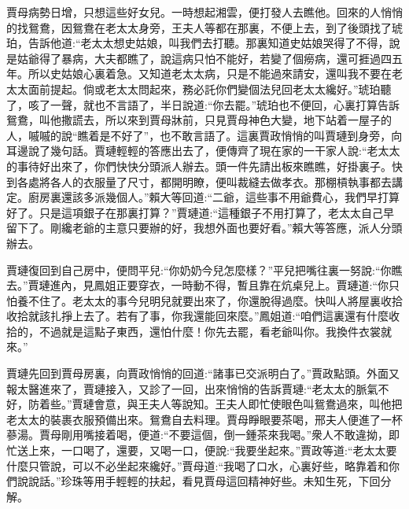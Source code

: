 \begin{parag}
    賈母病勢日增，只想這些好女兒。一時想起湘雲，便打發人去瞧他。回來的人悄悄的找鴛鴦，因鴛鴦在老太太身旁，王夫人等都在那裏，不便上去，到了後頭找了琥珀，告訴他道:“老太太想史姑娘，叫我們去打聽。那裏知道史姑娘哭得了不得，說是姑爺得了暴病，大夫都瞧了，說這病只怕不能好，若變了個癆病，還可捱過四五年。所以史姑娘心裏着急。又知道老太太病，只是不能過來請安，還叫我不要在老太太面前提起。倘或老太太問起來，務必託你們變個法兒回老太太纔好。”琥珀聽了，咳了一聲，就也不言語了，半日說道:“你去罷。”琥珀也不便回，心裏打算告訴鴛鴦，叫他撒謊去，所以來到賈母牀前，只見賈母神色大變，地下站着一屋子的人，嘁嘁的說“瞧着是不好了”，也不敢言語了。這裏賈政悄悄的叫賈璉到身旁，向耳邊說了幾句話。賈璉輕輕的答應出去了，便傳齊了現在家的一干家人說:“老太太的事待好出來了，你們快快分頭派人辦去。頭一件先請出板來瞧瞧，好掛裏子。快到各處將各人的衣服量了尺寸，都開明瞭，便叫裁縫去做孝衣。那棚槓執事都去講定。廚房裏還該多派幾個人。”賴大等回道:“二爺，這些事不用爺費心，我們早打算好了。只是這項銀子在那裏打算？”賈璉道:“這種銀子不用打算了，老太太自己早留下了。剛纔老爺的主意只要辦的好，我想外面也要好看。”賴大等答應，派人分頭辦去。
\end{parag}


\begin{parag}
    賈璉復回到自己房中，便問平兒:“你奶奶今兒怎麼樣？”平兒把嘴往裏一努說:“你瞧去。”賈璉進內，見鳳姐正要穿衣，一時動不得，暫且靠在炕桌兒上。賈璉道:“你只怕養不住了。老太太的事今兒明兒就要出來了，你還脫得過麼。快叫人將屋裏收拾收拾就該扎掙上去了。若有了事，你我還能回來麼。”鳳姐道:“咱們這裏還有什麼收拾的，不過就是這點子東西，還怕什麼！你先去罷，看老爺叫你。我換件衣裳就來。”
\end{parag}


\begin{parag}
    賈璉先回到賈母房裏，向賈政悄悄的回道:“諸事已交派明白了。”賈政點頭。外面又報太醫進來了，賈璉接入，又診了一回，出來悄悄的告訴賈璉:“老太太的脈氣不好，防着些。”賈璉會意，與王夫人等說知。王夫人即忙使眼色叫鴛鴦過來，叫他把老太太的裝裹衣服預備出來。鴛鴦自去料理。賈母睜眼要茶喝，邢夫人便進了一杯蔘湯。賈母剛用嘴接着喝，便道:“不要這個，倒一鍾茶來我喝。”衆人不敢違拗，即忙送上來，一口喝了，還要，又喝一口，便說:“我要坐起來。”賈政等道:“老太太要什麼只管說，可以不必坐起來纔好。”賈母道:“我喝了口水，心裏好些，略靠着和你們說說話。”珍珠等用手輕輕的扶起，看見賈母這回精神好些。未知生死，下回分解。
\end{parag}